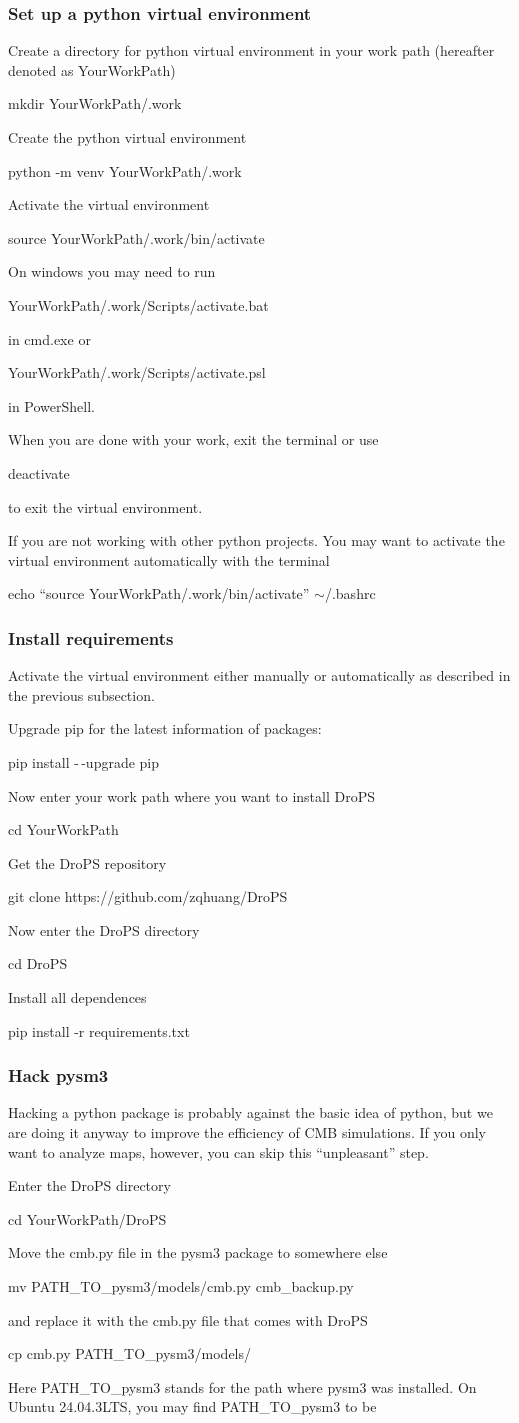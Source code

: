\documentclass[12pt, a4paper]{ctexart} %
\def\tbox#1{\begin{tcolorbox}#1\end{tcolorbox}}
\begin{document}
\subsubsection{Set up a python virtual environment}

Create a directory for python virtual environment in your work path (hereafter denoted as YourWorkPath)
\tbox{mkdir YourWorkPath/.work}

Create the python virtual environment
\tbox{python  -m  venv YourWorkPath/.work}

Activate the virtual environment
\tbox{source YourWorkPath/.work/bin/activate}
On windows you may need to run
\tbox{YourWorkPath/.work/Scripts/activate.bat}
in cmd.exe or
\tbox{YourWorkPath/.work/Scripts/activate.psl}
in PowerShell.

When you are done with your work, exit the terminal or use
\tbox{deactivate}
to exit the virtual environment.

If you are not working with other python projects. You may want to activate the virtual environment automatically with the terminal 
\tbox{echo ``source YourWorkPath/.work/bin/activate'' \>\> $\sim$/.bashrc}

\subsubsection{Install requirements}


Activate the virtual environment either manually or automatically as described in the previous subsection.

Upgrade pip for the latest information of packages:
\tbox{pip install -\,-upgrade pip}

Now enter your work path where you want to install DroPS
\tbox{cd YourWorkPath}
Get the DroPS repository
\tbox{git clone https://github.com/zqhuang/DroPS}

Now enter the DroPS directory
\tbox{cd DroPS}
Install all dependences
\tbox{pip install -r requirements.txt}

\subsubsection{Hack pysm3}

Hacking a python package is probably against the basic idea of python, but we are doing it anyway to improve the efficiency of CMB simulations. If you only want to analyze maps, however, you can skip this ``unpleasant'' step.

Enter the DroPS directory
\tbox{cd YourWorkPath/DroPS}
Move the cmb.py file in the pysm3 package to somewhere else
\tbox{mv PATH\_TO\_pysm3/models/cmb.py cmb\_backup.py}
and replace it with the cmb.py file that comes with DroPS
\tbox{cp cmb.py PATH\_TO\_pysm3/models/}
Here PATH\_TO\_pysm3 stands for the path where pysm3 was installed. On Ubuntu 24.04.3LTS, you may find PATH\_TO\_pysm3 to be
\end{document}
